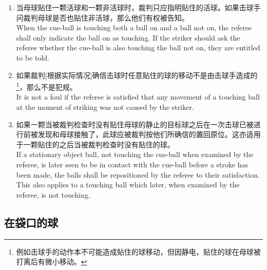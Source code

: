 \begin{enumerate}[label=(\alph*)]
    \item 当母球贴住一颗活球和一颗非活球时，裁判只应指明贴住的活球。如果击球手问裁判母球是否也贴住非活球，那么他们有权被告知。\\
    When the cue-ball is touching both a ball on and a ball not on, the referee shall only indicate the ball on as touching. If the striker should ask the referee whether the cue-ball is also touching the ball not on, they are entitled to be told.
    \item 如果裁判[根据实际情况]确信击球时任意贴住的球的移动不是由击球手造成的\footnote{例如击球手的动作本不可能造成贴住的球移动，但因静电，贴住的球在母球被打离后有微小移动。}，那么不是犯规。\\
    It is not a foul if the referee is satisfied that any movement of a touching ball at the moment of striking was not caused by the striker.
    \item 如果一颗当被裁判检查时没有贴住母球的静止的目标球之后在一次击球已被进行前被发现和母球接触了，此球应被裁判按他们所确信的置回原位。这亦适用于一颗贴住的之后当被裁判检查时没有贴住的球。\\
    If a stationary object ball, not touching the cue-ball when examined by the referee, is later seen to be in contact with the cue-ball before a stroke has been made, the balls shall be repositioned by the referee to their satisfaction. This also applies to a touching ball which later, when examined by the referee, is not touching.
\end{enumerate}

\subsection{在袋口的球}\label{2239}

